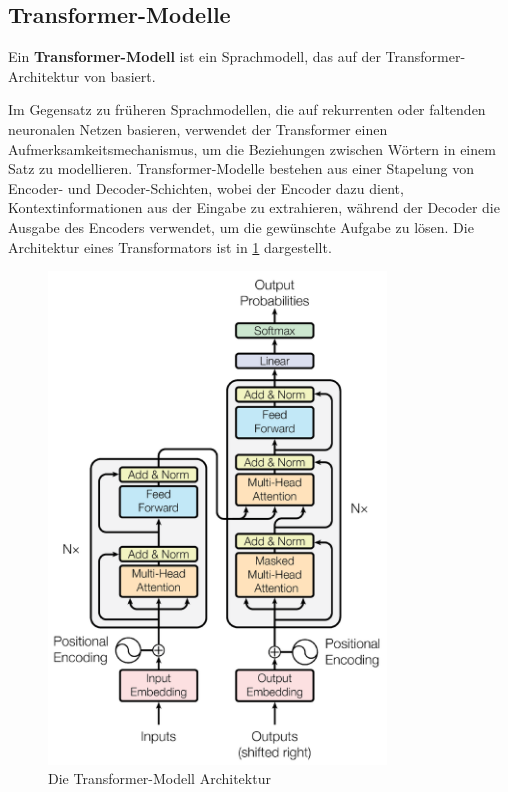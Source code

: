 \subsection{Transformer-Modelle}\label{sec:grundlagen:transformer}

\begin{definition}\label{def:transformer-modell}
    Ein \textbf{Transformer-Modell} ist ein Sprachmodell, das auf der Transformer-Architektur von \citet{attention} basiert.
\end{definition}
Im Gegensatz zu früheren Sprachmodellen, die auf rekurrenten oder faltenden neuronalen Netzen basieren, verwendet der Transformer einen Aufmerksamkeitsmechanismus, um die Beziehungen zwischen Wörtern in einem Satz zu modellieren.
Transformer-Modelle bestehen aus einer Stapelung von Encoder- und Decoder-Schichten, wobei der Encoder dazu dient, Kontextinformationen aus der Eingabe zu extrahieren,
während der Decoder die Ausgabe des Encoders verwendet, um die gewünschte Aufgabe zu lösen.
Die Architektur eines Transformators ist in \cref{bild:transformer} dargestellt.\\

\begin{figure}[ht]
    \centering
    \includegraphics[width=0.8\textwidth]{zeichnungen/transformer.png}
    \caption[Die Transformer-Modell Architektur]{Die Transformer-Modell Architektur \citep{attention}}
    \label{bild:transformer}
\end{figure}

